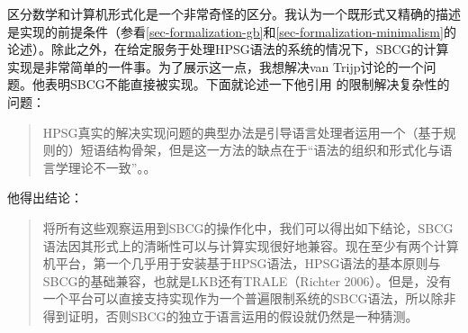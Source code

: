 
区分数学和计算机形式化是一个非常奇怪的区分。我认为一个既形式又精确的描述是实现的前提条件（参看\ref{sec-formalization-gb}和\ref{sec-formalization-minimalism}的论述）。除此之外，在给定服务于处理HPSG语法的系统的情况下，SBCG的计算实现是非常简单的一件事。为了展示这一点，我想解决van Trijp讨论的一个问题。他表明SBCG不能直接被实现。下面就论述一下他引用 \citep[\S~4.2.2]{LM2006a}的限制解决复杂性的问题：
\begin{quote}
HPSG真实的解决实现问题的典型办法是引导语言处理者运用一个（基于规则的）短语结构骨架，但是这一方法的缺点在于“语法的组织和形式化与语言学理论不一致”\citep[\S~4.2.2]{LM2006a}。\citep[]{vanTrijp2013a}。
\end{quote}
他得出结论：
\begin{quote}
将所有这些观察运用到SBCG的操作化中，我们可以得出如下结论，SBCG语法因其形式上的清晰性可以与计算实现很好地兼容。现在至少有两个计算机平台，第一个几乎用于安装基于HPSG语法，HPSG语法的基本原则与SBCG的基础兼容，也就是LKB\citep{Copestake2002a}还有TRALE（Richter 2006）。但是，没有一个平台可以直接支持实现作为一个普遍限制系统的SBCG语法，所以除非得到证明，否则SBCG的独立于语言运用的假设就仍然是一种猜测。
\end{quote}
